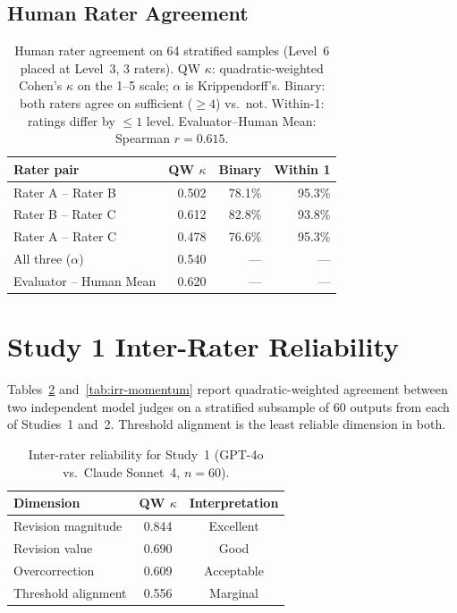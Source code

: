\subsection{Human Rater Agreement}

\begin{table}[h]
\centering
\small
\setlength{\tabcolsep}{4pt}
\begin{tabular}{@{}lrrr@{}}
\toprule
Rater pair & QW $\kappa$ & Binary & Within 1 \\
\midrule
Rater A -- Rater B & 0.502 & 78.1\% & 95.3\% \\
Rater B -- Rater C & 0.612 & 82.8\% & 93.8\% \\
Rater A -- Rater C & 0.478 & 76.6\% & 95.3\% \\
\midrule
All three ($\alpha$) & 0.540 & --- & --- \\
Evaluator -- Human Mean & 0.620 & --- & --- \\
\bottomrule
\end{tabular}
\caption{Human rater agreement on 64 stratified samples (Level~6 placed at Level~3, 3 raters). QW $\kappa$: quadratic-weighted Cohen's $\kappa$ on the 1--5 scale; $\alpha$ is Krippendorff's. Binary: both raters agree on sufficient ($\geq 4$) vs.\ not. Within-1: ratings differ by $\leq 1$ level. Evaluator--Human Mean: Spearman $r = 0.615$.}
\label{tab:human-agreement}
\end{table}

\section{Study 1 Inter-Rater Reliability}
\label{sec:appendix-irr}

Tables~\ref{tab:irr} and~\ref{tab:irr-momentum} report quadratic-weighted agreement between two independent model judges on a stratified subsample of 60 outputs from each of Studies~1 and~2. Threshold alignment is the least reliable dimension in both.

\begin{table}[h]
\centering
\small
\begin{tabular}{@{}lcc@{}}
\toprule
\textbf{Dimension} & \textbf{QW $\kappa$} & \textbf{Interpretation} \\
\midrule
Revision magnitude & 0.844 & Excellent \\
Revision value & 0.690 & Good \\
Overcorrection & 0.609 & Acceptable \\
Threshold alignment & 0.556 & Marginal \\
\bottomrule
\end{tabular}
\caption{Inter-rater reliability for Study~1 (GPT-4o vs.\ Claude Sonnet~4, $n = 60$).}
\label{tab:irr}
\end{table}

